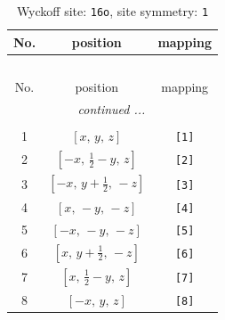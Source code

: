 \documentclass[fleqn,8pt]{jsarticle}
\begin{document}
\renewcommand{\arraystretch}{1.2}
\begin{longtable}{ccc}
\caption{Wyckoff site: {\tt 16o}, site symmetry: {\tt 1}}
 \\
 \hline \hline
No. & position & mapping \\ \hline \endfirsthead

\multicolumn{2}{l}{\tablename\ \thetable{}} \\
 \hline \hline
No. & position & mapping \\ \hline \endhead

 \hline \hline
\multicolumn{2}{r}{\footnotesize\it continued ...} \\ \endfoot

 \hline \hline
\multicolumn{2}{r}{} \\ \endlastfoot

1 & $\left[ x,\, y,\, z \right]$ & {\tt [1]} \\ \hline
2 & $\left[ - x,\, \frac{1}{2} - y,\, z \right]$ & {\tt [2]} \\ \hline
3 & $\left[ - x,\, y + \frac{1}{2},\, - z \right]$ & {\tt [3]} \\ \hline
4 & $\left[ x,\, - y,\, - z \right]$ & {\tt [4]} \\ \hline
5 & $\left[ - x,\, - y,\, - z \right]$ & {\tt [5]} \\ \hline
6 & $\left[ x,\, y + \frac{1}{2},\, - z \right]$ & {\tt [6]} \\ \hline
7 & $\left[ x,\, \frac{1}{2} - y,\, z \right]$ & {\tt [7]} \\ \hline
8 & $\left[ - x,\, y,\, z \right]$ & {\tt [8]} \\
\end{longtable}
\end{document}
